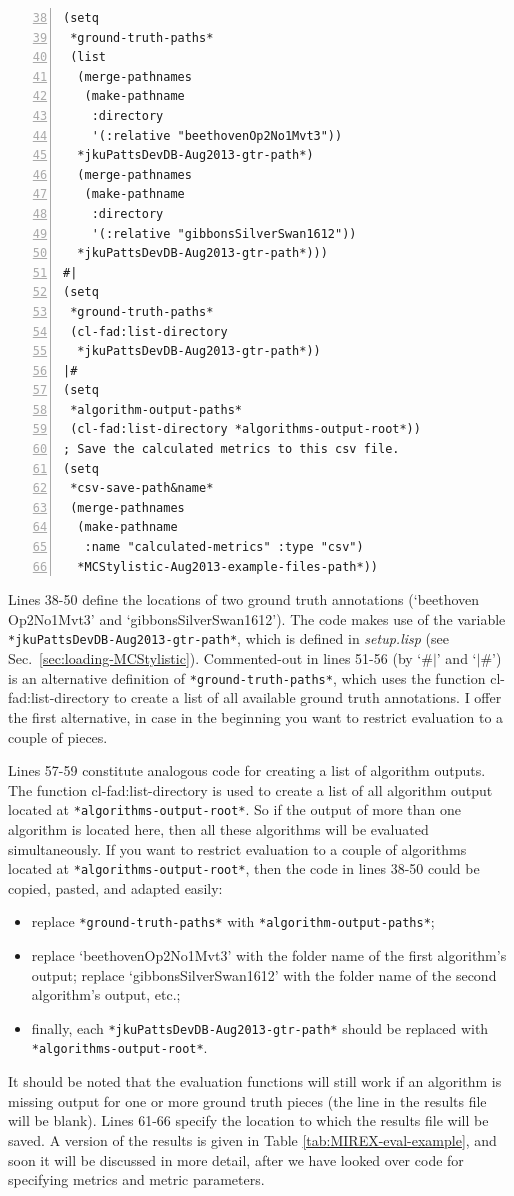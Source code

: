 \begin{Verbatim}[frame=single,numbers=left,firstnumber=38]
(setq
 *ground-truth-paths*
 (list
  (merge-pathnames
   (make-pathname
    :directory
    '(:relative "beethovenOp2No1Mvt3"))
  *jkuPattsDevDB-Aug2013-gtr-path*)
  (merge-pathnames
   (make-pathname
    :directory
    '(:relative "gibbonsSilverSwan1612"))
  *jkuPattsDevDB-Aug2013-gtr-path*)))
#|
(setq
 *ground-truth-paths*
 (cl-fad:list-directory
  *jkuPattsDevDB-Aug2013-gtr-path*))
|#
(setq
 *algorithm-output-paths*
 (cl-fad:list-directory *algorithms-output-root*))
; Save the calculated metrics to this csv file.
(setq
 *csv-save-path&name*
 (merge-pathnames
  (make-pathname
   :name "calculated-metrics" :type "csv")
  *MCStylistic-Aug2013-example-files-path*))
\end{Verbatim}
Lines 38-50 define the locations of two ground truth annotations (`beethoven\\Op2No1Mvt3' and `gibbonsSilverSwan1612'). The code makes use of the variable \texttt{*jkuPattsDevDB-Aug2013-gtr-path*}, which is defined in \emph{setup.lisp} (see Sec.~\ref{sec:loading-MCStylistic}). Commented-out in lines 51-56 (by `\#$|$' and `$|$\#') is an alternative definition of \texttt{*ground-truth-paths*}, which uses the function cl-fad:list-directory to create a list of all available ground truth annotations. I offer the first alternative, in case in the beginning you want to restrict evaluation to a couple of pieces.

Lines 57-59 constitute analogous code for creating a list of algorithm outputs. The function cl-fad:list-directory is used to create a list of all algorithm output located at \texttt{*algorithms-output-root*}. So if the output of more than one algorithm is located here, then all these algorithms will be evaluated simultaneously. If you want to restrict evaluation to a couple of algorithms located at \texttt{*algorithms-output-root*}, then the code in lines 38-50 could be copied, pasted, and adapted easily:
\begin{itemize}
\item replace \texttt{*ground-truth-paths*} with \texttt{*algorithm-output-paths*};
\item replace `beethovenOp2No1Mvt3' with the folder name of the first algorithm's output; replace `gibbonsSilverSwan1612' with the folder name of the second algorithm's output, etc.;
\item finally, each \texttt{*jkuPattsDevDB-Aug2013-gtr-path*} should be replaced with \texttt{*algorithms-output-root*}.
\end{itemize}
It should be noted that the evaluation functions will still work if an algorithm is missing output for one or more ground truth pieces (the line in the results file will be blank). Lines 61-66 specify the location to which the results file will be saved. A version of the results is given in Table \ref{tab:MIREX-eval-example}, and soon it will be discussed in more detail, after we have looked over code for specifying metrics and metric parameters.

